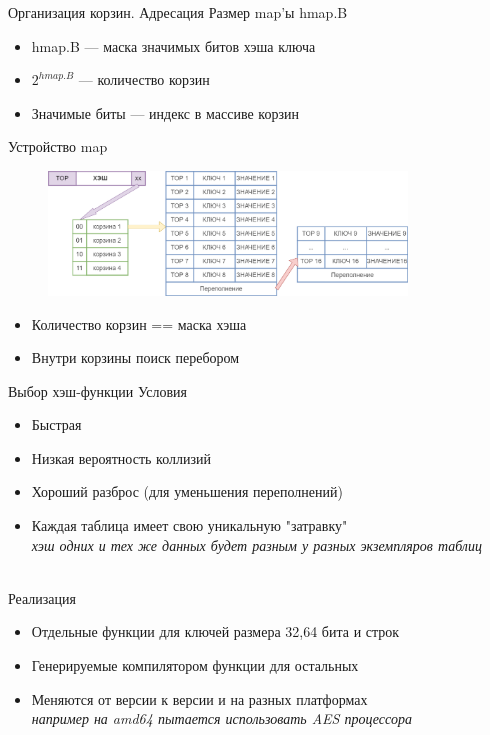 \documentclass[aspectratio=169]{beamer}
\begin{document}
\begin{frame}{Организация корзин. Адресация}
        Размер map'ы hmap.B
        \begin{itemize}
                \item hmap.B --- маска значимых битов хэша ключа \\
                \item $2^{hmap.B}$ --- количество корзин
                \item Значимые биты --- индекс в массиве корзин
        \end{itemize}
\end{frame}

\begin{frame}[label=buckets]{Устройство map}
        \begin{figure}
                \includegraphics[width=0.85\textwidth]{img/buckets.png} \\
        \end{figure}
        \begin{itemize}
                \item Количество корзин == маска хэша
                \item Внутри корзины поиск перебором
        \end{itemize}
\end{frame}

\begin{frame}{Выбор хэш-функции}
        Условия
        \begin{itemize}
               \item Быстрая
               \item Низкая вероятность коллизий
               \item Хороший разброс (для уменьшения переполнений)
               \item Каждая таблица имеет свою уникальную "затравку" \\
               \textit{\small хэш одних и тех же данных будет разным у разных экземпляров таблиц}
        \end{itemize}
        ~\\
        Реализация
        \begin{itemize}
                \item Отдельные функции для ключей размера 32,64 бита и строк
                \item Генерируемые компилятором функции для остальных
                \item Меняются от версии к версии и на разных платформах\\
                \textit{\small например на amd64 пытается использовать AES процессора}
        \end{itemize}
\end{frame}
\end{document}
